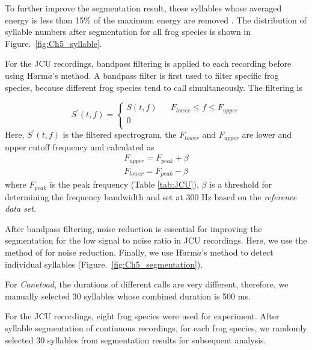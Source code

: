 To further improve the segmentation result, those syllables whose averaged energy is less than 15\% of the maximum energy are removed \citep{Gingras2013}. The distribution of syllable numbers after segmentation for all frog species is shown in Figure.~\ref{fig:Ch5_syllable}.


For the JCU recordings, bandpass filtering is applied to each recording before using H$\ddot{a}$rm$\ddot{a}$'s method. A bandpass filter is first used to filter specific frog species, because different frog species tend to call simultaneously.   The filtering is 

$$ S^{'}(t,f) =\left\{
\begin{array}{rcl}
 S(t,f) && F_{lower} \leq f　\leq F_{upper}  \\
0 \\
\end{array}
\right.
$$
Here, $S^{'}(t,f)$ is the filtered spectrogram, the $F_{lower}$ and  $F_{upper}$ are lower and upper cutoff frequency and calculated as 
\begin{equation}
\begin{aligned}
F_{upper} = F_{peak} + \beta \\
F_{lower} = F_{peak} - \beta
\end{aligned}
\end{equation}
\noindent where $F_{peak}$ is the peak frequency (Table \ref{tab:JCU}), $\beta$ is a threshold for determining the frequency bandwidth and set at 300 Hz based on the \textit{reference data set}.

After bandpass filtering, noise reduction is essential for
improving the segmentation for the low
signal to noise ratio in JCU recordings. Here, we use the method of \cite{towsey2012toolbox} for noise reduction. Finally, we use H$\ddot{a}$rm$\ddot{a}$'s method to detect individual syllables (Figure.~\ref{fig:Ch5_segmentation}). 

For \textit{Canetoad}, the durations of different calls are very different, therefore, we manually selected 30 syllables whose combined duration is 500 ms.

For the JCU recordings, eight frog species were used for experiment. After syllable segmentation of continuous recordings, for each frog species, we randomly selected 30 syllables from segmentation results for subsequent analysis.


